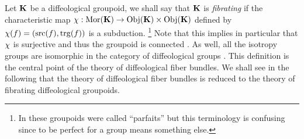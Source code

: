 \begin{article}
  \label{Fibrating-groupoids}
  Let ${\mathbf K}$ be a diffeological groupoid,
  we shall say that ${\mathbf K}$ is {\em fibrating\/} if the characteristic map $\chi : {\operatorname{Mor}}({\mathbf K}) \to {\operatorname{Obj}}({\mathbf K}) \times {\operatorname{Obj}}({\mathbf K})$ defined by $\chi(f) = ({\operatorname{src}}(f),{\operatorname{trg}}(f))$ is a subduction.%
  \footnote{In \cite{Igl85} these groupoids were called ``parfaits'' but this terminology is confusing since to be perfect for a group means something else.}
  Note that this implies in particular that $\chi$ is surjective and thus the groupoid is connected .
  As well,
  all the isotropy groups are isomorphic in the category of diffeological groups .
  This definition is the central point of the theory of diffeological fiber bundles.
  We shall see in the following that the theory of diffeological fiber bundles is reduced to the theory of fibrating diffeological groupoids.
\end{article} %

